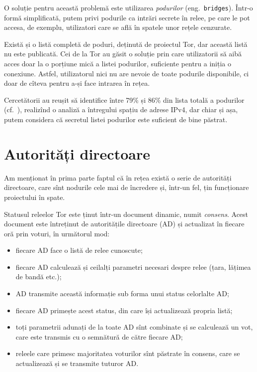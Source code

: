 O soluție pentru această problemă este utilizarea \emph{podurilor} (eng.\ \texttt{bridges}).
Într-o formă simplificată, putem privi podurile ca intrări secrete în relee, pe care le
pot accesa, de exemplu, utilizatori care se află în spatele unor rețele cenzurate.

Există și o listă completă de poduri, deținută de proiectul Tor, dar această listă
nu este publicată. Cei de la Tor au găsit o soluție prin care utilizatorii să aibă
acces doar la o porțiune mică a listei podurilor, suficiente pentru a iniția o conexiune.
Astfel, utilizatorul nici nu are nevoie de toate podurile disponibile, ci doar de cîteva
pentru a-și face intrarea în rețea.

Cercetătorii au reușit să identifice între 79\% și 86\% din lista totală a podurilor
(cf.\ \cite{jw1}), realizînd o analiză a întregului spațiu de adrese IPv4, dar 
chiar și așa, putem considera că secretul listei podurilor este suficient de bine păstrat.

\section{Autorități directoare} 

\indent\indent Am menționat în prima parte faptul că în rețea există o serie
de autorități directoare, care sînt nodurile cele mai de încredere și, într-un fel,
țin funcționare proiectului în spate.

Statusul releelor Tor este ținut într-un document dinamic, numit \emph{consens}. 
Acest document este întreținut de autoritățile directoare (AD) și actualizat
în fiecare oră prin voturi, în următorul mod:
\begin{itemize}
  \item fiecare AD face o listă de relee cunoscute;
  \item fiecare AD calculează și ceilalți parametri necesari despre relee (țara,
    lățimea de bandă etc.);
  \item AD transmite această informație sub forma unui status celorlalte AD;
  \item fiecare AD primește acest status, din care își actualizează propria
    listă;
  \item toți parametrii adunați de la toate AD sînt combinate și se cal\-cu\-lea\-ză
    un vot, ca\-re este transmis cu o semnătură de către fiecare AD;
  \item releele care primesc majoritatea voturilor sînt păstrate în consens, ca\-re
    se actualizează și se transmite tuturor AD.
\end{itemize}

